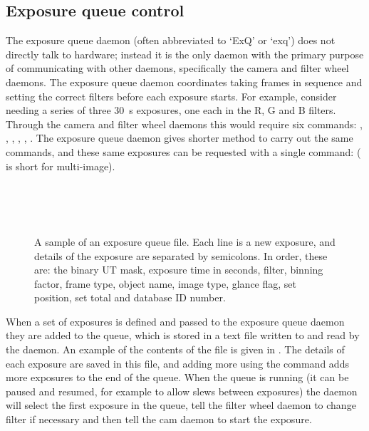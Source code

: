 \begin{colsection}
\begin{colsection}
\end{colsection}


\subsection{Exposure queue control}
\label{sec:exq}
\begin{colsection}

The exposure queue daemon (often abbreviated to `ExQ' or `exq') does not directly talk to hardware; instead it is the only daemon with the primary purpose of communicating with other daemons, specifically the camera and filter wheel daemons. The exposure queue daemon coordinates taking frames in sequence and setting the correct filters before each exposure starts. For example, consider needing a series of three \SI{30}{\second} exposures, one each in the R, G and B filters. Through the camera and filter wheel daemons this would require six commands: , , , , , . The exposure queue daemon gives shorter method to carry out the same commands, and these same exposures can be requested with a single command:  ( is short for multi-image).

\begin{figure}[t]
\begin{center}
\vspace{1cm}
\\
\\
\\
\vspace{0cm}
\end{center}
\caption[A sample exposure queue file]{A sample of an exposure queue file. Each line is a new exposure, and details of the exposure are separated by semicolons. In order, these are: the binary UT mask, exposure time in seconds, filter, binning factor, frame type, object name, image type, glance flag, set position, set total and database ID number.}
\label{fig:exq_file}
\end{figure}

When a set of exposures is defined and passed to the exposure queue daemon they are added to the queue, which is stored in a text file written to and read by the daemon. An example of the contents of the file is given in . The details of each exposure are saved in this file, and adding more using the  command adds more exposures to the end of the queue. When the queue is running (it can be paused and resumed, for example to allow slews between exposures) the daemon will select the first exposure in the queue, tell the filter wheel daemon to change filter if necessary and then tell the cam daemon to start the exposure.


\end{colsection}
\end{colsection}
